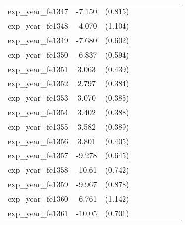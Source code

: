 {\begin{tabular}{l*{4}{cc}}
exp\_year\_fe1347&   -7.150\sym{***}&  (0.815)&                  &         &                  &         &                  &         \\
exp\_year\_fe1348&   -4.070\sym{***}&  (1.104)&                  &         &                  &         &                  &         \\
exp\_year\_fe1349&   -7.680\sym{***}&  (0.602)&                  &         &                  &         &                  &         \\
exp\_year\_fe1350&   -6.837\sym{***}&  (0.594)&                  &         &                  &         &                  &         \\
exp\_year\_fe1351&    3.063\sym{***}&  (0.439)&                  &         &                  &         &                  &         \\
exp\_year\_fe1352&    2.797\sym{***}&  (0.384)&                  &         &                  &         &                  &         \\
exp\_year\_fe1353&    3.070\sym{***}&  (0.385)&                  &         &                  &         &                  &         \\
exp\_year\_fe1354&    3.402\sym{***}&  (0.388)&                  &         &                  &         &                  &         \\
exp\_year\_fe1355&    3.582\sym{***}&  (0.389)&                  &         &                  &         &                  &         \\
exp\_year\_fe1356&    3.801\sym{***}&  (0.405)&                  &         &                  &         &                  &         \\
exp\_year\_fe1357&   -9.278\sym{***}&  (0.645)&                  &         &                  &         &                  &         \\
exp\_year\_fe1358&   -10.61\sym{***}&  (0.742)&                  &         &                  &         &                  &         \\
exp\_year\_fe1359&   -9.967\sym{***}&  (0.878)&                  &         &                  &         &                  &         \\
exp\_year\_fe1360&   -6.761\sym{***}&  (1.142)&                  &         &                  &         &                  &         \\
exp\_year\_fe1361&   -10.05\sym{***}&  (0.701)&                  &         &                  &         &                  &         \\

\end{tabular}}
